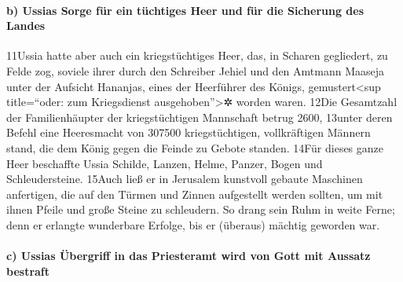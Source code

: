 \hypertarget{b-ussias-sorge-fuxfcr-ein-tuxfcchtiges-heer-und-fuxfcr-die-sicherung-des-landes}{%
\paragraph{b) Ussias Sorge für ein tüchtiges Heer und für die Sicherung
des
Landes}\label{b-ussias-sorge-fuxfcr-ein-tuxfcchtiges-heer-und-fuxfcr-die-sicherung-des-landes}}

11Ussia hatte aber auch ein kriegstüchtiges Heer, das, in Scharen
gegliedert, zu Felde zog, soviele ihrer durch den Schreiber Jehiel und
den Amtmann Maaseja unter der Aufsicht Hananjas, eines der Heerführer
des Königs, gemustert\textless sup title=``oder: zum Kriegsdienst
ausgehoben''\textgreater✲ worden waren. 12Die Gesamtzahl der
Familienhäupter der kriegstüchtigen Mannschaft betrug 2600, 13unter
deren Befehl eine Heeresmacht von 307500 kriegstüchtigen, vollkräftigen
Männern stand, die dem König gegen die Feinde zu Gebote standen. 14Für
dieses ganze Heer beschaffte Ussia Schilde, Lanzen, Helme, Panzer, Bogen
und Schleudersteine. 15Auch ließ er in Jerusalem kunstvoll gebaute
Maschinen anfertigen, die auf den Türmen und Zinnen aufgestellt werden
sollten, um mit ihnen Pfeile und große Steine zu schleudern. So drang
sein Ruhm in weite Ferne; denn er erlangte wunderbare Erfolge, bis er
(überaus) mächtig geworden war.

\hypertarget{c-ussias-uxfcbergriff-in-das-priesteramt-wird-von-gott-mit-aussatz-bestraft}{%
\paragraph{c) Ussias Übergriff in das Priesteramt wird von Gott mit
Aussatz
bestraft}\label{c-ussias-uxfcbergriff-in-das-priesteramt-wird-von-gott-mit-aussatz-bestraft}}

